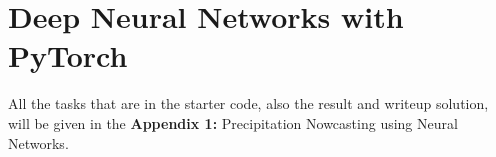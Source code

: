 \documentclass[a4paper, 10pt]{article}
\begin{document}
\subject[2110573 - Pattern Recognition]


\section{Deep Neural Networks with PyTorch}


All the tasks that are in the starter code, also the result and writeup solution,
will be given in the \textbf{Appendix 1:} Precipitation Nowcasting using Neural Networks.



\end{document}
